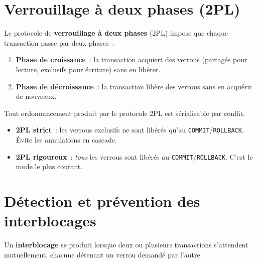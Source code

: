 \section{Verrouillage \`a deux phases (2PL)}

\begin{definition}[Protocole 2PL]
Le protocole de \textbf{verrouillage \`a deux phases} (2PL) impose que
chaque transaction passe par deux phases~:
\begin{enumerate}
  \item \textbf{Phase de croissance}~: la transaction acquiert des verrous
        (partag\'es pour lecture, exclusifs pour \'ecriture) sans en lib\'erer.
  \item \textbf{Phase de d\'ecroissance}~: la transaction lib\`ere des verrous
        sans en acqu\'erir de nouveaux.
\end{enumerate}
\end{definition}

\begin{theoreme}[Correction de 2PL]
Tout ordonnancement produit par le protocole 2PL est s\'erialisable par conflit.
\end{theoreme}

\begin{definition}
\begin{itemize}
  \item \textbf{2PL strict}~: les verrous exclusifs ne sont lib\'er\'es qu'au
        \texttt{COMMIT}/\texttt{ROLLBACK}. \'Evite les annulations en cascade.
  \item \textbf{2PL rigoureux}~: \emph{tous} les verrous sont lib\'er\'es au
        \texttt{COMMIT}/\texttt{ROLLBACK}. C'est le mode le plus courant.
\end{itemize}
\end{definition}

\section{D\'etection et pr\'evention des interblocages}

\begin{definition}
Un \textbf{interblocage} se produit lorsque deux ou plusieurs transactions
s'attendent mutuellement, chacune d\'etenant un verrou demand\'e par l'autre.
\end{definition}

